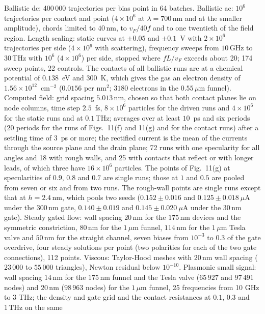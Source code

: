 \documentclass[aps,prapplied,onecolumn,superscriptaddress,floatfix]{revtex4-2}
\newcommand{\vF}{v_{F}}
\newcommand{\um}{\,\mu\mathrm{m}}
\newcommand{\nm}{\,\mathrm{nm}}
\newcommand{\THz}{\,\mathrm{THz}}
\newcommand{\GHz}{\,\mathrm{GHz}}
\begin{document}
Ballistic dc: 400\,000 trajectories per bias point in 64 batches. Ballistic
ac: $10^{6}$ trajectories per contact and point ($4\times10^{6}$ at
$\lambda=700\nm$ and at the smaller amplitude), chords limited to $40\nm$, to
$\vF/40f$ and to one twentieth of the field region. Length scaling: static
curves at $\pm0.05$ and $\pm0.1$~V with $2\times10^{6}$ trajectories per
side ($4\times10^{6}$ with scattering), frequency sweeps from $10\GHz$ to
$30\THz$ with $10^{6}$ ($4\times10^{6}$) per side, stopped where $fL/\vF$
exceeds about 20; 174 sweep points, 22 controls. The contacts of all
ballistic runs are at a chemical potential of $0.138$~eV and $300$~K,
which gives the gas an electron density of $1.56\times10^{12}$~cm$^{-2}$
($0.0156$ per nm$^{2}$; $3180$ electrons in the $0.55\um$ funnel).
Computed field: grid
spacing $5.013\nm$, chosen so that both contact planes lie on node
columns, time step $2.5$~fs, $8\times10^{6}$ particles for the driven
runs and $4\times10^{6}$ for the static runs and at $0.1\THz$; averages
over at least $10$~ps and six periods (20 periods for the runs of
Figs.~11(f) and 11(g) and for the contact runs) after a settling time of $3$~ps or more; the
rectified current is the mean of the currents through the source plane
and the drain plane; 72 runs with one specularity for all angles and 18
with rough walls, and 25 with contacts that reflect or with longer
leads, of which three have $16\times10^{6}$ particles. The points of Fig.~11(g) at specularities
of $0.9$, $0.8$ and $0.7$ are single runs; those at $1$ and $0.5$ are
pooled from seven or six and from two runs. The rough-wall points are
single runs except that at $h=2.4\nm$, which pools two seeds
($0.152\pm0.016$ and $0.125\pm0.018\ \mu$A under the $300\nm$ gate,
$0.140\pm0.019$ and $0.145\pm0.020\ \mu$A under the $30\nm$ gate). Steady gated flow: wall
spacing $20\nm$ for the $175\nm$ devices and the symmetric constriction, $80\nm$ for the $1\um$
funnel, $114\nm$ for the $1\um$ Tesla valve and $50\nm$ for the straight channel, seven biases from $10^{-3}$ to $0.3$ of the gate overdrive, four
steady solutions per point (two polarities for each of the two gate
connections), 112 points. Viscous: Taylor-Hood
meshes with $20\nm$ wall spacing ($23\,000$ to $55\,000$ triangles),
Newton residual below $10^{-10}$. Plasmonic small signal: wall spacing
$14\nm$ for the $175\nm$ funnel and the Tesla valve ($65\,927$ and
$97\,491$ nodes) and $20\nm$ ($98\,963$ nodes) for the
$1\um$ funnel, 25 frequencies from 10 GHz to 3 THz; the density and gate
grid and the contact resistances at $0.1$, $0.3$ and $1\THz$ on the same
\end{document}
